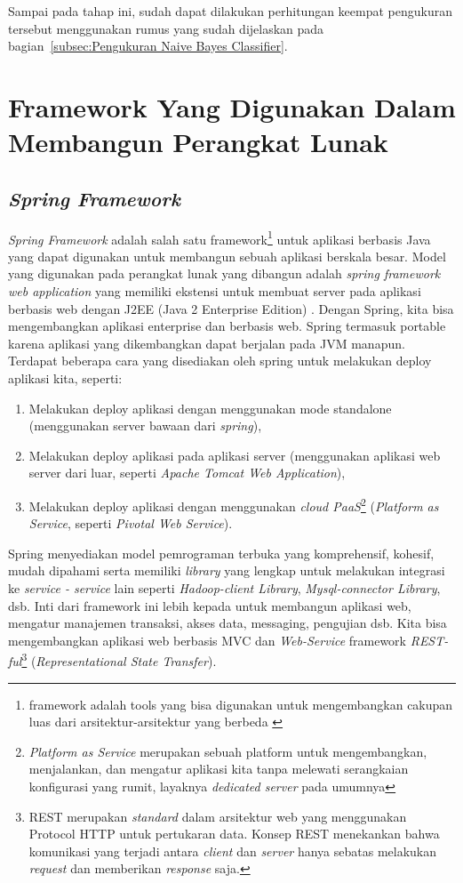 Sampai pada tahap ini, sudah dapat dilakukan perhitungan keempat pengukuran tersebut menggunakan rumus yang sudah dijelaskan pada bagian~\ref{subsec:Pengukuran Naive Bayes Classifier}.
	
\section{Framework Yang Digunakan Dalam Membangun Perangkat Lunak}

\subsection{\textit{Spring Framework}}
\label{subsec:Spring Framework}

\textit{Spring Framework} adalah salah satu framework\footnote{framework adalah tools yang bisa digunakan untuk mengembangkan cakupan luas dari arsitektur-arsitektur yang berbeda \cite{setiawan2009pemilihan}} untuk aplikasi berbasis Java yang dapat digunakan untuk membangun sebuah aplikasi berskala besar. Model yang digunakan pada perangkat lunak yang dibangun adalah \textit{spring framework web application} yang memiliki ekstensi untuk membuat server pada aplikasi berbasis web dengan J2EE (Java 2 Enterprise Edition) \cite{SpringCommerceToha:2010}. Dengan Spring, kita bisa mengembangkan aplikasi enterprise dan berbasis web. Spring termasuk portable karena aplikasi yang dikembangkan dapat berjalan pada JVM manapun. Terdapat beberapa cara yang disediakan oleh spring untuk melakukan deploy aplikasi kita, seperti: 
\begin{enumerate}
	\item Melakukan deploy aplikasi dengan menggunakan mode standalone (menggunakan server bawaan dari \textit{spring}),
	\item Melakukan deploy aplikasi pada aplikasi server (menggunakan aplikasi web server dari luar, seperti \textit{Apache Tomcat Web Application}),
	\item Melakukan deploy aplikasi dengan menggunakan \textit{cloud PaaS}\footnote{\textit{Platform as Service} merupakan sebuah platform untuk mengembangkan, menjalankan, dan mengatur aplikasi kita tanpa melewati serangkaian konfigurasi yang rumit, layaknya \textit{dedicated server} pada umumnya} (\textit{Platform as Service}, seperti \textit{Pivotal Web Service}).
\end{enumerate}
Spring menyediakan model pemrograman terbuka yang komprehensif, kohesif, mudah dipahami serta memiliki \textit{library} yang lengkap untuk melakukan integrasi ke \textit{service - service} lain seperti \textit{Hadoop-client Library}, \textit{Mysql-connector Library}, dsb. Inti dari framework ini lebih kepada untuk membangun aplikasi web, mengatur manajemen transaksi, akses data, messaging, pengujian dsb. Kita bisa mengembangkan aplikasi web berbasis MVC dan \textit{Web-Service} framework \textit{REST-ful}\footnote{REST merupakan \textit{standard} dalam arsitektur web yang menggunakan Protocol HTTP untuk pertukaran data.  Konsep REST menekankan bahwa komunikasi yang terjadi antara \textit{client} dan \textit{server} hanya sebatas melakukan \textit{request} dan memberikan \textit{response} saja.} (\textit{Representational State Transfer}).

